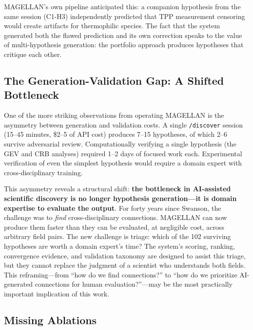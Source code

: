 MAGELLAN's own pipeline anticipated this: a companion hypothesis from the same session (C1-H3) independently predicted that TPP measurement censoring would create artifacts for thermophilic species. The fact that the system generated both the flawed prediction and its own correction speaks to the value of multi-hypothesis generation: the portfolio approach produces hypotheses that critique each other.

\subsection{The Generation-Validation Gap: A Shifted Bottleneck}

One of the more striking observations from operating MAGELLAN is the asymmetry between generation and validation costs. A single \texttt{/discover} session (15--45 minutes, \$2--5 of API cost) produces 7--15 hypotheses, of which 2--6 survive adversarial review. Computationally verifying a single hypothesis (the GEV and CRB analyses) required 1--2 days of focused work each. Experimental verification of even the simplest hypothesis would require a domain expert with cross-disciplinary training.

This asymmetry reveals a structural shift: \textbf{the bottleneck in AI-assisted scientific discovery is no longer hypothesis generation---it is domain expertise to evaluate the output}. For forty years since Swanson, the challenge was to \emph{find} cross-disciplinary connections. MAGELLAN can now produce them faster than they can be evaluated, at negligible cost, across arbitrary field pairs. The new challenge is triage: which of the 102 surviving hypotheses are worth a domain expert's time? The system's scoring, ranking, convergence evidence, and validation taxonomy are designed to assist this triage, but they cannot replace the judgment of a scientist who understands both fields. This reframing---from ``how do we find connections?'' to ``how do we prioritize AI-generated connections for human evaluation?''---may be the most practically important implication of this work.

\subsection{Missing Ablations}

